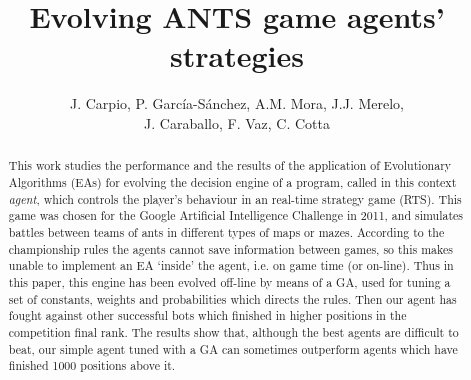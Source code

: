 \documentclass[runningheads]{llncs}
\begin{document}
\mainmatter  %



\title{Evolving ANTS game agents' strategies} 



%
\author{J. Carpio, P. Garc\'ia-S\'anchez, A.M. Mora, J.J. Merelo,\\ 
J. Caraballo, F. Vaz, C. Cotta}
%
%
%
%



\maketitle

\begin{abstract}
This work studies the performance and the results of the application of Evolutionary Algorithms (EAs) for evolving the decision engine of a program, called in this context \textit{agent}, which controls the player's behaviour in an real-time strategy game (RTS). This game was chosen for the Google Artificial Intelligence Challenge in 2011, and simulates battles between teams of ants in different types of maps or mazes.
According to the championship rules the agents cannot save information between games, so this makes unable to implement an EA `inside' the agent, i.e. on game time (or on-line).
Thus in this paper, this engine has been evolved off-line by means of a GA, used for tuning a set of constants, weights and probabilities which directs the rules. Then our agent has fought against other successful bots which finished in higher positions in the competition final rank.
The results show that, although the best agents are difficult to beat, our simple agent tuned with a GA can sometimes outperform agents which have finished 1000 positions above it.

\end{abstract}
\end{document}
